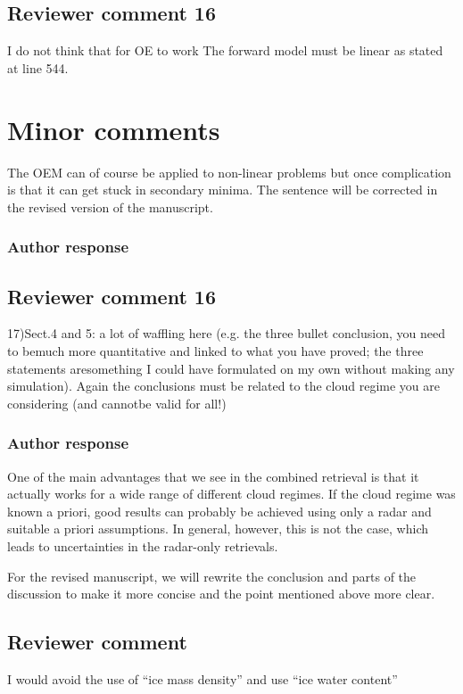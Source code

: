 \documentclass[11pt]{scrartcl}
\begin{document}
\subsection*{Reviewer comment 16}
I do not think that for OE to work The forward model must be linear as stated at line 544.

\section{Minor comments}

The OEM can of course be applied to non-linear problems but once complication is
that it can get stuck in secondary minima. The sentence will be corrected in
the revised version of the manuscript.

\subsubsection*{Author response}

\subsection*{Reviewer comment 16}
17)Sect.4 and 5:  a lot of waffling here (e.g.  the three bullet conclusion, you need to bemuch more quantitative and linked to what you have proved; the three statements aresomething I could have formulated on my own without making any simulation).  Again the conclusions must be related to the cloud regime you are considering (and cannotbe valid for all!)

\subsubsection*{Author response}

One of the main advantages that we see in the combined retrieval is that it
actually works for a wide range of different cloud regimes. If the cloud regime
was known a priori, good results can probably be achieved using only a radar and
suitable a priori assumptions. In general, however, this is not the case, which
leads to uncertainties in the radar-only retrievals.

For the revised manuscript, we will rewrite the conclusion and parts of the discussion to make
it more concise and the point mentioned above more clear.

\subsection*{Reviewer comment}
I would avoid the use of “ice mass density” and use “ice water content”
\end{document}
